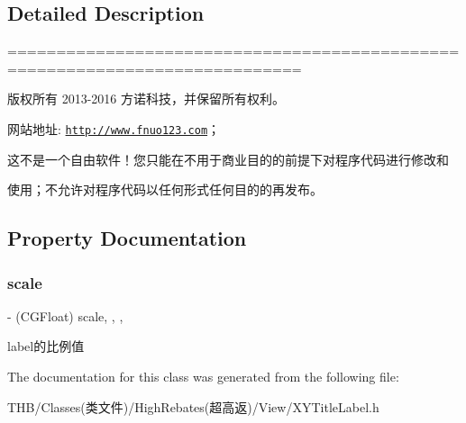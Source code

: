 \subsection{Detailed Description}
============================================================================

版权所有 2013-\/2016 方诺科技，并保留所有权利。

网站地址\+: \href{http://www.fnuo123.com}{\tt http\+://www.\+fnuo123.\+com}； 



这不是一个自由软件！您只能在不用于商业目的的前提下对程序代码进行修改和

使用；不允许对程序代码以任何形式任何目的的再发布。 

 

\subsection{Property Documentation}
\mbox{\label{interface_x_y_title_label_af626ab6a0e22b12ac7c440baa0382e93}} 
\subsubsection{\texorpdfstring{scale}{scale}}
{\footnotesize\ttfamily -\/ (C\+G\+Float) scale\hspace{0.3cm}{\ttfamily [read]}, {\ttfamily [write]}, {\ttfamily [nonatomic]}, {\ttfamily [assign]}}

label的比例值 

The documentation for this class was generated from the following file\+:\begin{DoxyCompactItemize}
\item 
T\+H\+B/\+Classes(类文件)/\+High\+Rebates(超高返)/\+View/X\+Y\+Title\+Label.\+h\end{DoxyCompactItemize}
